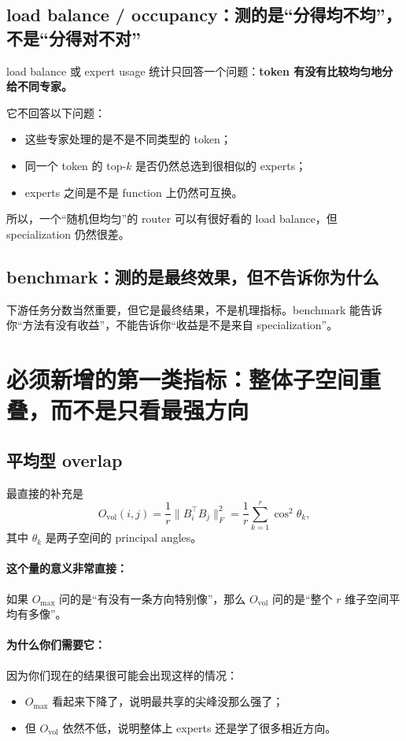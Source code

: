 \documentclass[11pt]{article}
\begin{document}
\subsection{load balance / occupancy：测的是“分得均不均”，不是“分得对不对”}
load balance 或 expert usage 统计只回答一个问题：\textbf{token 有没有比较均匀地分给不同专家。}

它不回答以下问题：
\begin{itemize}
    \item 这些专家处理的是不是不同类型的 token；
    \item 同一个 token 的 top-$k$ 是否仍然总选到很相似的 experts；
    \item experts 之间是不是 function 上仍然可互换。
\end{itemize}

所以，一个“随机但均匀”的 router 可以有很好看的 load balance，但 specialization 仍然很差。

\subsection{benchmark：测的是最终效果，但不告诉你为什么}
下游任务分数当然重要，但它是最终结果，不是机理指标。benchmark 能告诉你“方法有没有收益”，不能告诉你“收益是不是来自 specialization”。

\section{必须新增的第一类指标：整体子空间重叠，而不是只看最强方向}

\subsection{平均型 overlap}
最直接的补充是
\[
    O_{\mathrm{vol}}(i,j)=\frac{1}{r}\|B_i^\top B_j\|_F^2
    =\frac{1}{r}\sum_{k=1}^r \cos^2\theta_k,
\]
其中 $\theta_k$ 是两子空间的 principal angles。

\paragraph{这个量的意义非常直接：}
如果 $O_{\max}$ 问的是“有没有一条方向特别像”，那么 $O_{\mathrm{vol}}$ 问的是“整个 $r$ 维子空间平均有多像”。

\paragraph{为什么你们需要它：}
因为你们现在的结果很可能会出现这样的情况：
\begin{itemize}
    \item $O_{\max}$ 看起来下降了，说明最共享的尖峰没那么强了；
    \item 但 $O_{\mathrm{vol}}$ 依然不低，说明整体上 experts 还是学了很多相近方向。
\end{itemize}
\end{document}
